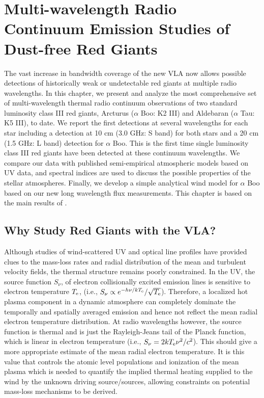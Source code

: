 
\chapter{Multi-wavelength Radio Continuum Emission Studies of \\ Dust-free Red Giants} \label{chap:6}

The vast increase in bandwidth coverage of the new VLA now allows possible detections of historically weak or undetectable red giants at multiple radio wavelengths. In this chapter, we present and analyze the most comprehensive set of multi-wavelength thermal radio continuum observations of two standard luminosity class III red giants, Arcturus ($\alpha$ Boo: K2 III) and Aldebaran ($\alpha$ Tau: K5 III), to date. We report the first detections at several wavelengths for each star including a detection at 10 cm (3.0 GHz: S band) for both stars and a 20 cm (1.5 GHz: L band) detection for $\alpha$ Boo. This is the first time single luminosity class III red giants have been detected at these continuum wavelengths. We compare our data with published semi-empirical atmospheric models based on UV data, and spectral indices are used to discuss the possible properties of the stellar atmospheres. Finally, we develop a simple analytical wind model for $\alpha$ Boo based on our new long wavelength flux measurements. This chapter is based on the main results of \cite{ogorman_2013}.

\section{Why Study Red Giants with the VLA?}\label{sec:6.1}
Although studies of wind-scattered UV and optical line profiles have provided clues to the mass-loss rates and radial distribution of the mean and turbulent velocity fields, the thermal structure remains poorly constrained. In the UV, the source function $S_{\nu}$, of electron collisionally excited emission lines is sensitive to electron temperature $T_{\rm{e}}$, (i.e., $S_{\nu} \propto e^{-h\nu /kT_{\rm{e}}}/\sqrt{T_{\rm{e}}}$). Therefore, a localized hot plasma component in a dynamic atmosphere can completely dominate the temporally and spatially averaged emission and hence not reflect the mean radial electron temperature distribution. At radio wavelengths however, the source function is thermal and is just the Rayleigh-Jeans tail of the Planck function, which is linear in electron temperature (i.e., $S_{\nu} = {2kT_{\rm{e}}\nu ^2 /c^2}$). This should give a more appropriate estimate of the mean radial electron temperature. It is this value that controls the atomic level populations and ionization of the mean plasma which is needed to quantify the implied thermal heating supplied to the  wind by the unknown driving source/sources, allowing constraints on potential mass-loss mechanisms to be derived.

